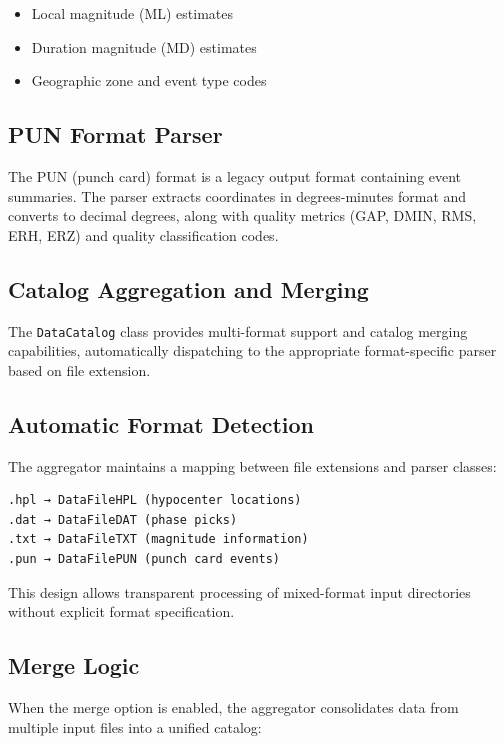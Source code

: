 \begin{itemize}
  \item Local magnitude (ML) estimates
  \item Duration magnitude (MD) estimates
  \item Geographic zone and event type codes
\end{itemize}

\subsection{PUN Format Parser}
The PUN (punch card) format is a legacy output format containing event
summaries. The parser extracts coordinates in degrees-minutes format and
converts to decimal degrees, along with quality metrics (GAP, DMIN, RMS,
ERH, ERZ) and quality classification codes.

\subsection{Catalog Aggregation and Merging}

The \texttt{DataCatalog} class provides multi-format support and
catalog merging
capabilities, automatically dispatching to the appropriate
format-specific parser
based on file extension.

\subsection{Automatic Format Detection}
The aggregator maintains a mapping between file extensions and parser classes:

\begin{verbatim}
.hpl → DataFileHPL (hypocenter locations)
.dat → DataFileDAT (phase picks)
.txt → DataFileTXT (magnitude information)
.pun → DataFilePUN (punch card events)
\end{verbatim}

This design allows transparent processing of mixed-format input directories
without explicit format specification.

\subsection{Merge Logic}
When the merge option is enabled, the aggregator consolidates data from
multiple input files into a unified catalog:


